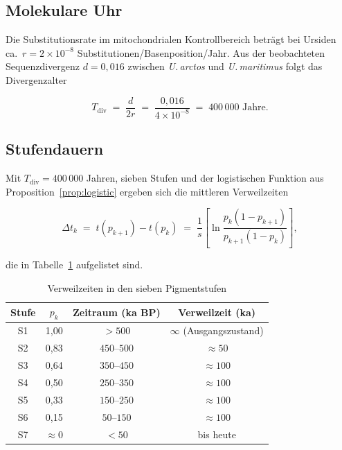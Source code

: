 ﻿\documentclass[12pt,a4paper]{article}
\theoremstyle{remark}
\begin{document}
\subsection{Molekulare Uhr}

Die Substitutionsrate im mitochondrialen Kontrollbereich betr\"{a}gt bei
Ursiden ca.~$r = 2 \times 10^{-8}$ Substitutionen/Basenposition/Jahr.
Aus der beobachteten Sequenzdivergenz $d = 0{,}016$ zwischen \textit{U.\,arctos}
und \textit{U.\,maritimus} folgt das Divergenzalter

\[
  T_{\text{div}} \;=\; \frac{d}{2r} \;=\; \frac{0{,}016}{4 \times 10^{-8}}
                 \;=\; 400\,000 \text{ Jahre}.
\]

\subsection{Stufendauern}

Mit $T_{\text{div}} = 400\,000$ Jahren, sieben Stufen und der logistischen
Funktion aus Proposition~\ref{prop:logistic} ergeben sich die mittleren
Verweilzeiten

\[
  \Delta t_k \;=\; t(p_{k+1}) - t(p_k)
  \;=\; \frac{1}{s}\left[\ln\!\frac{p_k(1-p_{k+1})}{p_{k+1}(1-p_k)}\right],
\]

die in Tabelle~\ref{tab:zeiten} aufgelistet sind.

\begin{table}[H]
  \centering
  \caption{Verweilzeiten in den sieben Pigmentstufen}
  \label{tab:zeiten}
  \begin{tabular}{cccc}
    \toprule
    Stufe & $p_k$ & Zeitraum (ka BP) & Verweilzeit (ka) \\
    \midrule
    S1 & 1{,}00 & $>500$       & $\infty$ (Ausgangszustand) \\
    S2 & 0{,}83 & $450$--$500$ & $\approx 50$ \\
    S3 & 0{,}64 & $350$--$450$ & $\approx 100$ \\
    S4 & 0{,}50 & $250$--$350$ & $\approx 100$ \\
    S5 & 0{,}33 & $150$--$250$ & $\approx 100$ \\
    S6 & 0{,}15 & $50$--$150$  & $\approx 100$ \\
    S7 & $\approx 0$ & $<50$   & bis heute \\
    \bottomrule
  \end{tabular}
\end{table}

\end{document}
